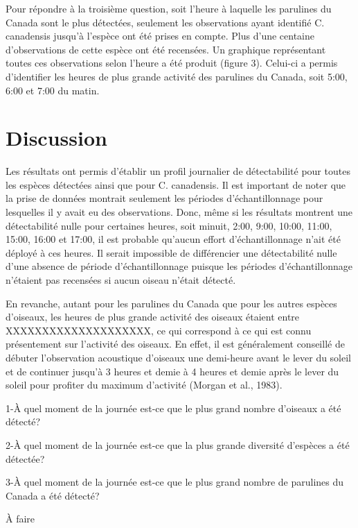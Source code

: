 \documentclass[9pt,twocolumn,twoside,]{pnas-new}
\begin{document}
Pour répondre à la troisième question, soit l'heure à laquelle les
parulines du Canada sont le plus détectées, seulement les observations
ayant identifié C. canadensis jusqu'à l'espèce ont été prises en compte.
Plus d'une centaine d'observations de cette espèce ont été recensées. Un
graphique représentant toutes ces observations selon l'heure a été
produit (figure 3). Celui-ci a permis d'identifier les heures de plus
grande activité des parulines du Canada, soit 5:00, 6:00 et 7:00 du
matin.

\hypertarget{discussion}{%
\section*{Discussion}\label{discussion}}

Les résultats ont permis d'établir un profil journalier de détectabilité
pour toutes les espèces détectées ainsi que pour C. canadensis. Il est
important de noter que la prise de données montrait seulement les
périodes d'échantillonnage pour lesquelles il y avait eu des
observations. Donc, même si les résultats montrent une détectabilité
nulle pour certaines heures, soit minuit, 2:00, 9:00, 10:00, 11:00,
15:00, 16:00 et 17:00, il est probable qu'aucun effort d'échantillonnage
n'ait été déployé à ces heures. Il serait impossible de différencier une
détectabilité nulle d'une absence de période d'échantillonnage puisque
les périodes d'échantillonnage n'étaient pas recensées si aucun oiseau
n'était détecté.

En revanche, autant pour les parulines du Canada que pour les autres
espèces d'oiseaux, les heures de plus grande activité des oiseaux
étaient entre XXXXXXXXXXXXXXXXXXXX, ce qui correspond à ce qui est connu
présentement sur l'activité des oiseaux. En effet, il est généralement
conseillé de débuter l'observation acoustique d'oiseaux une demi-heure
avant le lever du soleil et de continuer jusqu'à 3 heures et demie à 4
heures et demie après le lever du soleil pour profiter du maximum
d'activité (Morgan et al., 1983).

1-À quel moment de la journée est-ce que le plus grand nombre d'oiseaux
a été détecté?

2-À quel moment de la journée est-ce que la plus grande diversité
d'espèces a été détectée?

3-À quel moment de la journée est-ce que le plus grand nombre de
parulines du Canada a été détecté?

À faire
\end{document}
